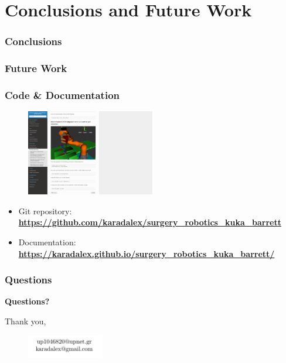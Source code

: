 \section{Conclusions and Future Work}

\begin{frame}
\frametitle{Conclusions}
\end{frame}

\begin{frame}
\frametitle{Future Work}
\end{frame}

\begin{frame}
\frametitle{Code \& Documentation}

\begin{center}
\begin{figure}[!htb]
\centering
\includegraphics[width=0.5\textwidth]{../images/documentation.png}
\end{figure}
\end{center}

\begin{itemize}
\item Git repository: \textbf{\url{https://github.com/karadalex/surgery_robotics_kuka_barrett}}
\item Documentation: \textbf{\url{https://karadalex.github.io/surgery_robotics_kuka_barrett/}}
\end{itemize}

\end{frame}


\begin{frame}
\frametitle{Questions}

\begin{center}
\begingroup
    \fontsize{14pt}{20pt}\selectfont
    \textbf{Questions?}\\
\endgroup

\vfill
Thank you,\\

\vfill
\begin{center}
\begin{figure}[!htb]
\centering
\includegraphics[width=0.3\textwidth]{../images/contact-info.png}
\end{figure}
\end{center}
\end{center}
\end{frame}